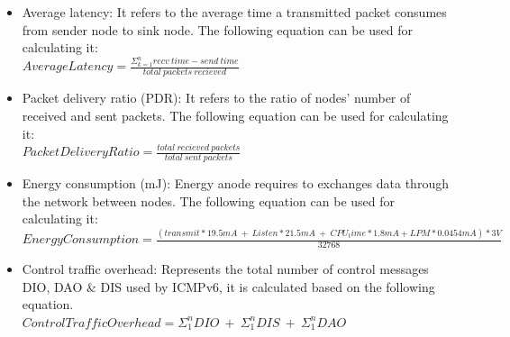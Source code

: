 \begin{itemize}
\item Average latency: It refers to the average time a transmitted packet consumes from sender node to sink node. The following equation can be used for calculating it:\\
$ Average Latency = \frac{\Sigma_{k=1}^{n}recv\ time-send\ time}{total\ packets\ recieved} $
\item Packet delivery ratio (PDR): It refers to the ratio of nodes’ number of received and sent packets. The following equation can be used for calculating it:\\
$ Packet Delivery Ratio = \frac{total\ recieved\ packets} {total\ sent\ packets}  $
\item Energy consumption (mJ): Energy anode requires to exchanges data through the network between nodes. The following equation can be used for calculating it:\\
$ EnergyConsumption = \frac{(transmit*19.5mA\ +\ Listen*21.5mA\ +\ CPU_time*1.8mA + LPM*0.0454mA)*3V} {32768} $
\item Control traffic overhead: Represents the total number of control messages DIO, DAO \& DIS used by ICMPv6, it is calculated based on the following equation.\\
$ ControlTrafficOverhead = \Sigma_{1}^{n}DIO\ +\ \Sigma_{1}^{n}DIS\ +\ \Sigma_{1}^{n}DAO $
\end{itemize}
